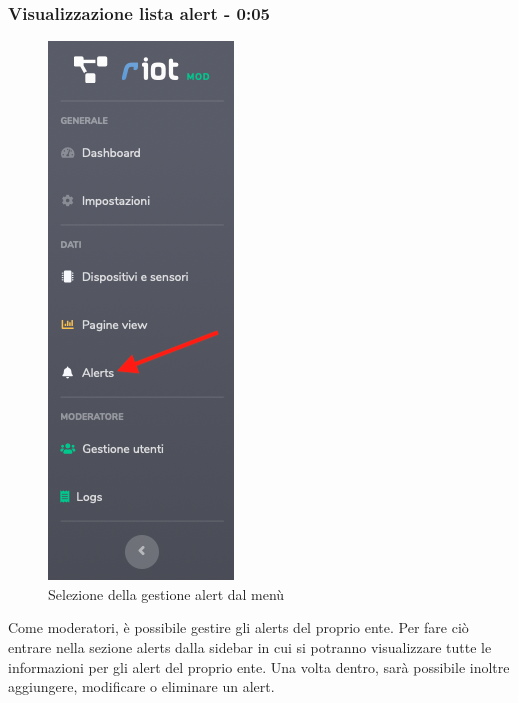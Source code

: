 	\subsubsection{Visualizzazione lista alert - 0:05}
		\begin{figure}[H]
		\centering
		\includegraphics[scale=0.600]{res/images/mod/menuAlert.png}
		\caption{Selezione della gestione alert dal menù}
	\end{figure}
		Come moderatori, è possibile gestire gli alerts del proprio ente.
		Per fare ciò entrare nella sezione alerts dalla sidebar in cui si potranno visualizzare tutte le informazioni per gli alert del proprio ente. 
		Una volta dentro, sarà possibile inoltre aggiungere, modificare o eliminare un alert.

